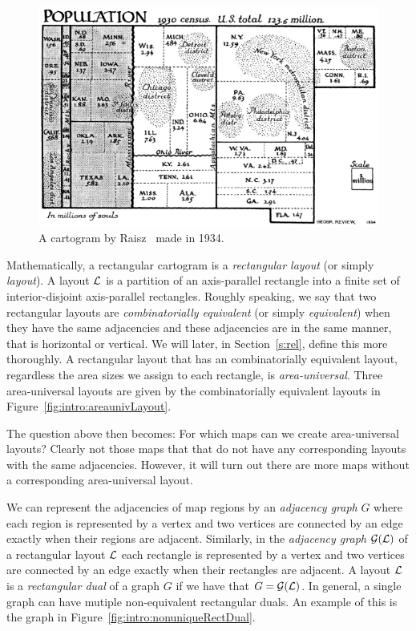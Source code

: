   \begin{figure}[!b]
    \centering
    \includegraphics[scale=.7]{introduction/img/cartogram.png}
    \caption{A cartogram by Raisz~\cite{Raisz1934} made in 1934.}
    \label{fig:intro:raisz}
  \end{figure}

  Mathematically, a rectangular cartogram is a  \emph{rectangular layout} (or simply \emph{layout}).
  A layout $\mathcal{L}$ is a partition of an axis-parallel rectangle into a finite set of interior-disjoint axis-parallel rectangles.
  Roughly speaking, we say that two rectangular layouts are \emph{combinatorially equivalent} (or simply \emph{equivalent}) when they have the same adjacencies and these adjacencies are in the same manner, that is horizontal or vertical. We will later, in Section~\ref{s:rel}, define this more thoroughly.
  A rectangular layout that has an combinatorially equivalent layout, regardless the area sizes we assign to each rectangle, is \emph{area-universal}. Three area-universal layouts are given by the  combinatorially equivalent layouts in Figure~\ref{fig:intro:areaunivLayout}.

  The question above then becomes: For which maps can we create area-universal layouts?
  Clearly not those maps that that do not have any corresponding layouts with the same adjacencies. However, it will turn out there are more maps without a corresponding area-universal layout.

  We can represent the adjacencies of map regions by an \emph{adjacency graph} $G$ where each region is represented by a vertex and two vertices are connected by an edge exactly when their regions are adjacent.
  Similarly, in the \emph{adjacency graph} $\mathcal{G}(\mathcal{L})$ of a rectangular layout $\mathcal{L}$ each rectangle is represented by a vertex and two vertices are connected by an edge exactly when their rectangles are adjacent.
  A layout $\mathcal{L}$ is a \emph{rectangular dual} of a graph $G$ if we have that $G = \mathcal{G}(\mathcal{L})$.
  In general, a single graph can have mutiple non-equivalent rectangular duals. An example of this is the graph in Figure~\ref{fig:intro:nonuniqueRectDual}.

